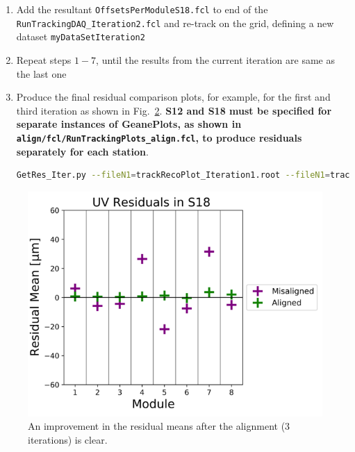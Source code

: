 \documentclass[12pt]{article}
\begin{document}
\begin{enumerate}
\begin{figure}[ht!]
        \caption{The alignment results with $10^5$ tracks after 2 iterations. The alignment stability is not yet reached, as seen by the alignment results from the previous iteration (shown in black) and current iteration (purple) not converged.}
        \label{fig:Align_Data}
    \end{figure}
     \item Add the resultant \verb!OffsetsPerModuleS18.fcl! to end of the \\ \verb!RunTrackingDAQ_Iteration2.fcl! and re-track on the grid, defining a new dataset \texttt{myDataSetIteration2}
     \item Repeat steps $1-7$, until the results from the current iteration are same as the last one
      \item Produce the final residual comparison plots, for example, for the first and third iteration as shown in Fig.~\ref{fig:Res_Data}. \textbf{S12 and S18 must be specified for separate instances of GeanePlots, as shown in \small{\texttt{align/fcl/RunTrackingPlots\_align.fcl}}, to produce residuals separately for each station}.
     \begin{lstlisting}[language=bash] 
     GetRes_Iter.py --fileN1=trackRecoPlot_Iteration1.root --fileN1=trackRecoPlot_Iteration3.root --stationN=S18  \end{lstlisting}
     \end{enumerate}
     \begin{figure}[ht]
    \centering
    \includegraphics[width = 0.5\linewidth]{fig/Res_Data.png}
    \caption{An improvement in the residual means after the alignment (3 iterations) is clear.}
    \label{fig:Res_Data}
    \end{figure}
\end{document}
